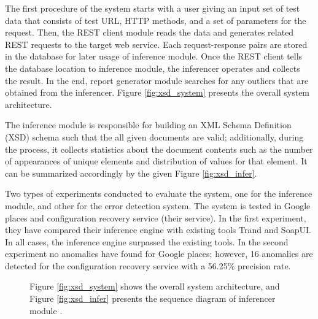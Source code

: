 \documentclass[english]{tktltiki}
\begin{document}
The first procedure of the system starts with a user giving an input set of test data that consists of test URL, HTTP methods, and a set of parameters for the request. Then, the REST client module reads the data and generates related REST requests to the target web service. Each request-response pairs are stored in the database for later usage of inference module. Once the REST client tells the database location to inference module, the inferencer operates and collects the result. In the end, report generator module searches for any outliers that are obtained from the inferencer. Figure \ref{fig:xsd_system} presents the overall system architecture.

The inference module is responsible for building an XML Schema Definition (XSD) schema such that the all given documents are valid; additionally, during the process, it collects statistics about the document contents such as the number of appearances of unique elements and distribution of values for that element. It can be summarized accordingly by the given Figure \ref{fig:xsd_infer}.

Two types of experiments conducted to evaluate the system, one for the inference module, and other for the error detection system. The system is tested in Google places and configuration recovery service (their service). In the first experiment, they have compared their inference engine with existing tools Trand and SoapUI. In all cases, the inference engine surpassed the existing tools. In the second experiment no anomalies have found for Google places; however, 16 anomalies are detected for the configuration recovery service with a 56.25\% precision rate.
\begin{figure}[h]
	\centering
	\hfill%
	\caption{Figure \ref{fig:xsd_system} shows the overall system architecture, and Figure \ref{fig:xsd_infer} presents the sequence diagram of inferencer module \cite{navas2014rest}. }
\end{figure}
\end{document}
